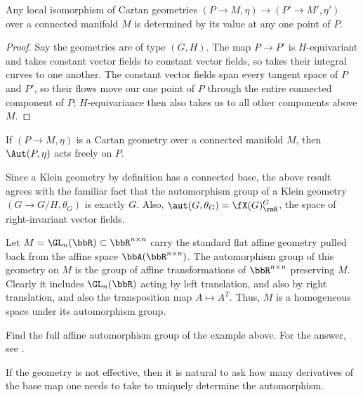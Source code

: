 \begin{thm}
    Any local isomorphism of Cartan geometries $(P\to M,\eta)\to (P'\to M',\eta')$ over a connected manifold $M$ is determined by its value at any one point of $P$.
\end{thm}
\begin{proof}
    Say the geometries are of type $(G,H)$. The map $P\to P'$ is $H$-equivariant and takes constant vector fields to constant vector fields, so takes their integral curves to one another. The constant vector fields span every tangent space of $P$ and $P'$, so their flows move our one point of $P$ through the entire connected component of $P$; $H$-equivariance then also takes us to all other components above $M$.
\end{proof}
\begin{cor}
    If $(P\to M,\eta)$ is a Cartan geometry over a connected manifold $M$, then $\Aut(P,\eta)$ acts freely on $P$.
\end{cor}

\begin{example}
    Since a Klein geometry by definition has a connected base, the above result agrees with the familiar fact that the automorphism group of a Klein geometry $(G\to G\slash H,\theta_G)$ is exactly $G$. Also, $\aut(G,\theta_G)=\fX(G)^G_\rmR$, the space of right-invariant vector fields.
\end{example}

\begin{example}
    Let $M=\GL_n(\bbR)\subset \bbR^{n\times n}$ carry the standard flat affine geometry pulled back from the affine space $\bbA(\bbR^{n\times n})$. The automorphism group of this geometry on $M$ is the group of affine transformations of $\bbR^{n\times n}$ preserving $M$. Clearly it includes $\GL_n(\bbR)$ acting by left translation, and also by right translation, and also the transposition map $A\mapsto A^T$. Thus, $M$ is a homogeneous space under its automorphism group.
\end{example}

\begin{xca}
    Find the full affine automorphism group of the example above. For the answer, see \cite{Dieudonne}.
\end{xca}

If the geometry is not effective, then it is natural to ask how many derivatives of the base map one needs to take to uniquely determine the automorphism.

